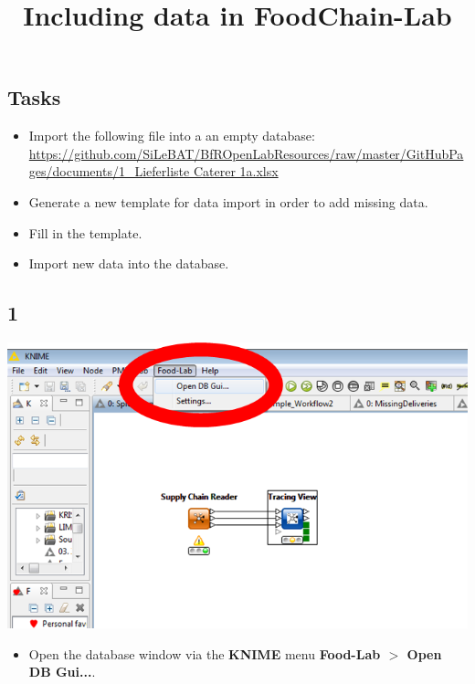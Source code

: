 \documentclass{beamer}
\title{Including data in FoodChain-Lab}
\date{}
\begin{document}
\maketitle

\section{ }

\subsection{Tasks}
\begin{frame}
	\begin{itemize}
		\item Import the following file into a an empty database: \url{https://github.com/SiLeBAT/BfROpenLabResources/raw/master/GitHubPages/documents/1_Lieferliste Caterer 1a.xlsx}
		\item Generate a new template for data import in order to add missing data.
        \item Fill in the template.
        \item Import new data into the database.
	\end{itemize}
\end{frame}
 
\subsection{1}
\begin{frame}
	\begin{center}
  		\includegraphics[height=0.6\textheight]{1.png}
	\end{center}
	\begin{itemize}
		\item Open the database window via the \textbf{KNIME} menu \textbf{Food-Lab $>$ Open DB Gui...}.
	\end{itemize}
\end{frame}
\end{document}
